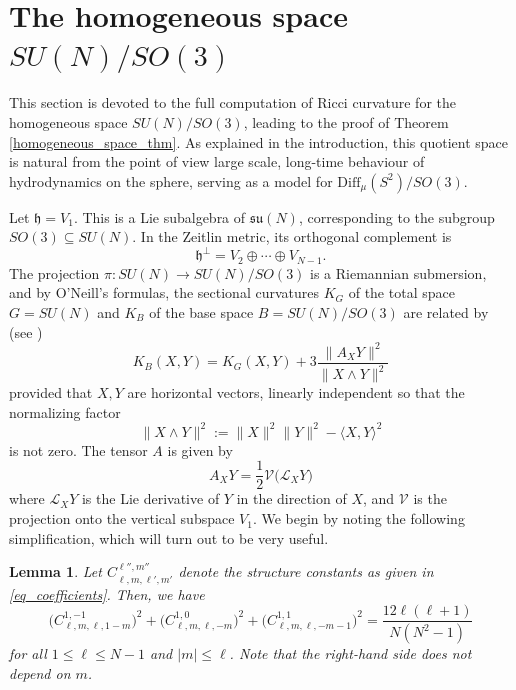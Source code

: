 \documentclass[11pt]{amsart}
\numberwithin{equation}{section}
\newtheorem{lemma}{Lemma}
\theoremstyle{definition}
\begin{document}
\section{The homogeneous space $SU(N)/SO(3)$}
\label{homogeneous_section}

This section is devoted to the full computation of Ricci curvature for the homogeneous space $SU(N)/SO(3)$, leading to the proof of Theorem \ref{homogeneous_space_thm}. As explained in the introduction, this quotient space is natural from the point of view large scale, long-time behaviour of hydrodynamics on the sphere, serving as a model for $\mathrm{Diff}_{\mu}(S^2)/SO(3)$. 

Let $\mathfrak{h} = V_1$. This is a Lie subalgebra of $\mathfrak{su}(N)$, corresponding to the subgroup ${SO(3) \subseteq SU(N)}$. In the Zeitlin metric, its orthogonal complement is
\begin{equation}
\mathfrak{h}^{\perp} = V_2 \oplus \cdots \oplus V_{N-1}.
\end{equation}
The projection $\pi : SU(N) \rightarrow SU(N)/SO(3)$ is a Riemannian submersion, and by O'Neill's formulas, the sectional curvatures $K_G$ of the total space $G = SU(N)$ and $K_B$ of the base space $B = SU(N)/SO(3)$ are related by (see \cite{oneill1966thefundamental})
\begin{equation}\label{eq_submersion_curvature}
K_B(X, Y) = K_G(X, Y) + 3\frac{\|A_XY\|^2}{\|X \wedge Y\|^2}
\end{equation}
provided that $X, Y$ are horizontal vectors, linearly independent so that the normalizing factor $${\|X \wedge Y\|^2 := \|X\|^2\|Y\|^2 - \langle X, Y \rangle^2}$$
is not zero. The tensor $A$ is given by
\begin{equation}
A_XY = \frac{1}{2}\mathcal{V}\big(\mathcal{L}_XY\big)
\end{equation}
where $\mathcal{L}_XY$ is the Lie derivative of $Y$ in the direction of $X$, and  $\mathcal{V}$ is the projection onto the vertical subspace $V_1$. We begin by noting the following simplification, which will turn out to be very useful. 
\begin{lemma}\label{lemma_3_sum}
Let $C_{\ell,m,\ell',m'}^{\ell'',m''}$ denote the structure constants as given in \eqref{eq_coefficients}. Then, we have
\begin{equation}
\Big(C_{\ell,m,\ell,1-m}^{1,-1}\Big)^2 + 
\Big(C_{\ell,m,\ell,-m}^{1,0}\Big)^2 + 
\Big(C_{\ell,m,\ell,-m-1}^{1,1}\Big)^2 = \frac{12\ell(\ell+1)}{N(N^2-1)}
\end{equation}    
for all $1 \leq \ell \leq N-1$ and $|m| \leq \ell$. Note that the right-hand side does not depend on $m$.
\end{lemma}
\end{document}
